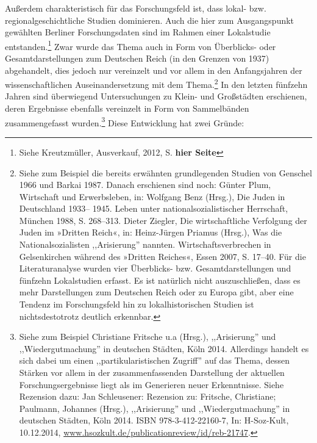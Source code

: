 Außerdem charakteristisch für das Forschungsfeld ist, dass lokal- bzw. regionalgeschichtliche Studien dominieren. Auch die hier zum Ausgangspunkt gewählten Berliner Forschungsdaten sind im Rahmen einer Lokalstudie entstanden.\footnote{Siehe Kreutzmüller, Ausverkauf, 2012, S. \textbf{hier Seite}} Zwar wurde das Thema auch in Form von Überblicks- oder Gesamtdarstellungen zum Deutschen Reich (in den Grenzen von 1937) abgehandelt, dies jedoch nur vereinzelt und vor allem in den Anfangsjahren der wissenschaftlichen Auseinandersetzung mit dem Thema.\footnote{Siehe zum Beispiel die bereits erwähnten grundlegenden Studien von Genschel 1966 und Barkai 1987. Danach erschienen sind noch: Günter
Plum, Wirtschaft und Erwerbsleben, in: Wolfgang Benz (Hrsg.), Die Juden in Deutschland 1933–
1945. Leben unter nationalsozialistischer Herrschaft, München 1988, S. 268–313. Dieter Ziegler, Die wirtschaftliche
Verfolgung der Juden im »Dritten Reich«, in: Heinz-Jürgen Priamus (Hrsg.), Was die
Nationalsozialisten ,,Arisierung'' nannten. Wirtschaftsverbrechen in Gelsenkirchen während des
»Dritten Reiches«, Essen 2007, S. 17–40. Für die Literaturanalyse wurden vier Überblicks- bzw. Gesamtdarstellungen und fünfzehn Lokalstudien erfasst. Es ist natürlich nicht auszuschließen, dass es mehr Darstellungen zum Deutschen Reich oder zu Europa gibt, aber eine Tendenz im Forschungsfeld hin zu lokalhistorischen Studien ist nichtsdestotrotz deutlich erkennbar.} In den letzten fünfzehn Jahren sind überwiegend Untersuchungen zu Klein- und Großstädten erschienen, deren Ergebnisse ebenfalls vereinzelt in Form von Sammelbänden zusammengefasst wurden.\footnote{Siehe zum Beispiel Christiane Fritsche u.a (Hrsg.), ,,Arisierung'' und ,,Wiedergutmachung'' in deutschen Städten, Köln 2014. Allerdings handelt es sich dabei um einen ,,partikularistischen Zugriff'' auf das Thema, dessen Stärken vor allem in der zusammenfassenden Darstellung der aktuellen Forschungsergebnisse liegt als im Generieren neuer Erkenntnisse. Siehe Rezension dazu: Jan Schleusener: Rezension zu: Fritsche, Christiane; Paulmann, Johannes (Hrsg.), ,,Arisierung'' und ,,Wiedergutmachung'' in deutschen Städten, Köln  2014. ISBN 978-3-412-22160-7, In: H-Soz-Kult, 10.12.2014, \url{www.hsozkult.de/publicationreview/id/reb-21747}.} Diese Entwicklung hat zwei Gründe:

